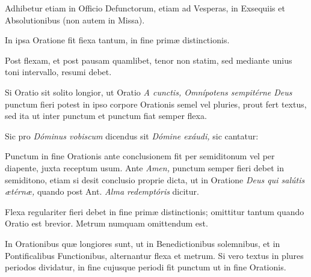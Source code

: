 \documentclass[vesperale_romanum.tex]{subfiles}
\begin{document}
Adhibetur etiam in Officio Defunctorum, etiam ad Vesperas, in Exsequiis et Absolutionibus (non autem in Missa).



In ipsa Oratione fit fiexa tantum, in fine primæ distinctionis.

Post flexam, et post pausam quamlibet, tenor non statim, sed mediante unius toni intervallo, resumi debet.

Si Oratio sit solito longior, ut Oratio \textit{A cunctis, Omnípotens sempitérne Deus} punctum fieri potest in ipso corpore Orationis semel vel pluries, prout fert textus, sed ita ut inter punctum et punctum fiat semper flexa.

Sic pro \textit{Dóminus vobiscum} dicendus sit \vv \textit{Dómine exáudi,} sic cantatur:





Punctum in fine Orationis ante conclusionem fit per semiditonum vel per diapente, juxta receptum usum. Ante \rr \textit{Amen,} punctum semper fieri debet in semiditono, etiam si desit conclusio proprie dicta, ut in Oratione \textit{Deus qui salútis ætérnæ,} quando post Ant. \textit{Alma redemptóris} dicitur.

Flexa regulariter fieri debet in fine primæ distinctionis; omittitur tantum quando Oratio est brevior. Metrum numquam omittendum est.

In Orationibus quæ longiores sunt, ut in Benedictionibus solemnibus, et in Pontificalibus Functionibus, alternantur flexa et metrum. Si vero textus in plures periodos dividatur, in fine cujusque periodi fit punctum ut in fine Orationis.



\end{document}
